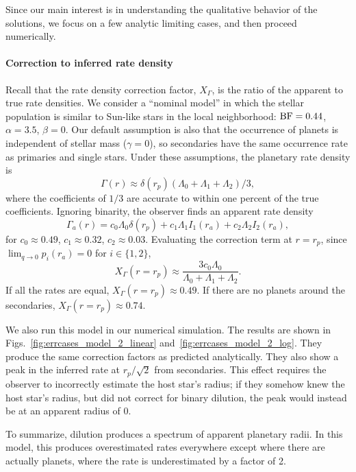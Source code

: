 Since our main interest is in understanding the qualitative behavior 
of the solutions, we focus on a few analytic limiting cases, and then 
proceed numerically.


\paragraph{Correction to inferred rate density}
Recall that the rate density correction factor, $X_\Gamma$, is the ratio of 
the apparent to true rate densities.
We consider a ``nominal model'' in which the stellar population is similar to 
Sun-like stars in the local neighborhood:
${\rm BF}=0.44$, $\alpha=3.5$, $\beta=0$.
Our default assumption is also that the occurrence of planets is independent 
of stellar mass ($\gamma=0$), so secondaries have the same occurrence rate as 
primaries and single stars.
Under these assumptions, the planetary rate density is
\begin{equation}
\Gamma(r) \approx \delta(r_p) \left( \Lambda_0 + \Lambda_1 + 
\Lambda_2 \right) / 3,
\label{eq:model2_Gamma_r}
\end{equation}
where the coefficients of $1/3$ are accurate to within one percent of the true 
coefficients.
Ignoring binarity, the observer finds an apparent rate density
\begin{equation}
\Gamma_a(r) = c_0 \Lambda_0 \delta(r_p)
             +c_1 \Lambda_1 I_1(r_a)
             +c_2 \Lambda_2 I_2(r_a),
\label{eq:model2_Gamma_a_r}
\end{equation}
for $c_0\approx 0.49$, $c_1\approx 0.32$, $c_2\approx 0.03$.
Evaluating the correction term at $r=r_p$, since $\lim_{q\rightarrow0} 
p_i(r_a)=0$ for $i\in\{1,2\}$,
\begin{equation}
X_\Gamma(r=r_p) \approx \frac{3c_0 \Lambda_0}{\Lambda_0+\Lambda_1+\Lambda_2}.
\end{equation}
If all the rates are equal, $X_\Gamma(r=r_p)\approx0.49$.
If there are no planets around the secondaries, $X_\Gamma(r=r_p)\approx0.74$.

We also run this model in our numerical simulation.
The results are shown in Figs.~\ref{fig:errcases_model_2_linear} 
and~\ref{fig:errcases_model_2_log}.
They produce the same correction factors as predicted analytically.
They also show a peak in the inferred rate at $r_p/\sqrt{2}$ from 
secondaries.
This effect requires the observer to incorrectly estimate the host star's 
radius; if they somehow knew the host star's radius, but did not correct for 
binary dilution, the peak would instead be at an apparent radius of 0.

To summarize, dilution produces a spectrum of apparent planetary radii. In 
this model, this produces overestimated rates everywhere except where there 
are actually planets, where the rate is underestimated by a factor of 2.
